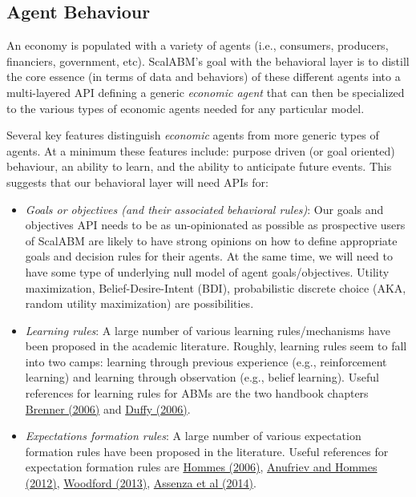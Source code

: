 \documentclass[a4paper]{article}
\begin{document}
\subsection{Agent Behaviour}
\label{Agent Behaviour}

An economy is populated with a variety of agents (i.e., consumers, producers, financiers, government, etc). ScalABM's goal with the behavioral layer is to distill the core essence (in terms of data and behaviors) of these different agents into a multi-layered API defining a generic \textit{economic agent} that can then be specialized to the various types of economic agents needed for any particular model.

Several key features distinguish \textit{economic} agents from more generic types of agents. At a minimum these features include: purpose driven (or goal oriented) behaviour, an ability to learn, and the ability to anticipate future events. This suggests that our behavioral layer will need APIs for:
\begin{itemize}
    \item \textit{Goals or objectives (and their associated behavioral rules)}: Our goals and objectives API needs to be as un-opinionated as possible as prospective users of ScalABM are likely to have strong opinions on how to define appropriate goals and decision rules for their agents. At the same time, we will need to have some type of underlying null model of agent goals/objectives. Utility maximization, Belief-Desire-Intent (BDI), probabilistic discrete choice (AKA, random utility maximization) are possibilities.
    \item \textit{Learning rules}: A large number of various learning rules/mechanisms have been proposed in the academic literature. Roughly, learning rules seem to fall into two camps: learning through previous experience (e.g., reinforcement learning) and learning through observation (e.g., belief learning). Useful references for learning rules for ABMs are the two handbook chapters \href{http://web.uvic.ca/~mingkang/econ353/project/Brenner.pdf}{Brenner (2006)} and \href{http://www.socsci.uci.edu/~duffy/papers/duffy2006.pdf}{Duffy (2006)}.
    \item \textit{Expectations formation rules}: A large number of various expectation formation rules have been proposed in the literature. Useful references for expectation formation rules are \href{http://feb.kuleuven.be/fac/Slides_Degrauwe/HomHBchapter23.pdf}{Hommes (2006)}, \href{http://econ.columbia.edu/files/econ/content/hommes_background_material_2.pdf}{Anufriev and Hommes (2012)}, \href{http://www.columbia.edu/~mw2230/AREcon.pdf}{Woodford (2013)}, \href{http://www.emeraldinsight.com/doi/pdfplus/10.1108/S0193-230620140000017002}{Assenza et al (2014)}.
\end{itemize}
\end{document}
